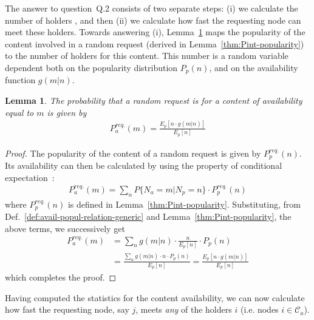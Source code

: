 \documentclass[journal]{IEEEtran}
\newtheorem{lemma}{Lemma}
\begin{document}
The answer to question~Q.2 consists of two separate steps: (i) we calculate the number of holders , and then (ii) we calculate how fast the requesting node can meet these holders. Towards answering (i), Lemma~\ref{thm:Pint-availability-generic} maps the popularity of the content involved in a random request (derived in Lemma~\ref{thm:Pint-popularity}) to the number of holders for this content. This number is a random variable dependent both on the popularity distribution $P_{p}(n)$, and on the availability function $g(m|n)$.
\begin{lemma}\label{thm:Pint-availability-generic}
The probability that a random request is for a content of availability equal to $m$ is given by
\begin{align}
 P_{a}^{req.}(m) = \frac{E_{p}[n\cdot g(m|n)]}{E_{p}[n]}\nonumber
\end{align}
\end{lemma}
\begin{proof}
The popularity of the content of a random request is given by $P_{p}^{req.}(n)$. Its availability can then be calculated by using the property of conditional expectation~\cite{RossProbModels}:
\begin{align}
 P_{a}^{req.}(m) = \sum_{n} P\lbrace N_{a} =m \vert N_{p} =n \rbrace\cdot P_{p}^{req.}(n)\nonumber
\end{align}
where $P_{p}^{req.}(n)$ is defined in Lemma~\ref{thm:Pint-popularity}. Substituting, from Def.~\ref{def:avail-popul-relation-generic} and Lemma~\ref{thm:Pint-popularity}, the above terms, we successively get
\begin{align}\label{eq:p-query-generic-3}
P_{a}^{req.}(m) &= \sum_{n} g(m|n)\cdot \frac{n}{E_{p}[n]}\cdot P_{p}(n)\nonumber\\
				 &= \frac{\sum_{n} g(m|n)\cdot n\cdot P_{p}(n)}{E_{p}[n]}= \frac{E_{p}[n\cdot g(m|n)]}{E_{p}[n]}\nonumber
\end{align}
which completes the proof.
\end{proof}

Having computed the statistics for the content availability, we can now calculate how fast the requesting node, say $j$, meets \textit{any} of the holders $i$ (i.e. nodes $i\in \mathcal{C}_{a}$). 
\end{document}

